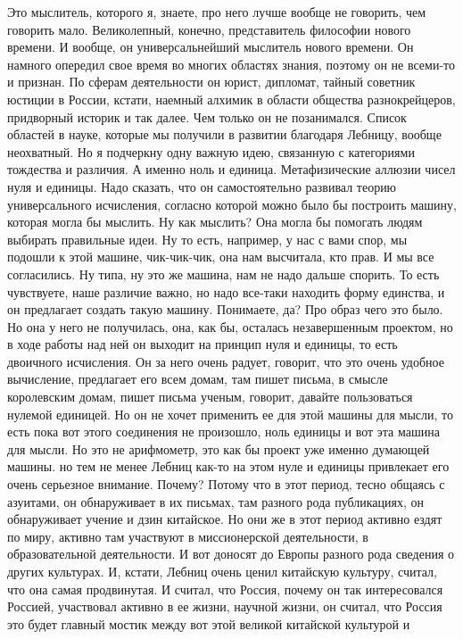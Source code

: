 Это мыслитель, которого я, знаете, про него лучше вообще не говорить,
чем говорить мало. Великолепный, конечно, представитель философии нового
времени. И вообще, он универсальнейший мыслитель нового времени. Он намного
опередил свое время во многих областях знания, поэтому он не всеми-то и признан.
По сферам деятельности он юрист, дипломат, тайный советник юстиции в России,
кстати, наемный алхимик в области общества разнокрейцеров, придворный историк и
так далее. Чем только он не позанимался. Список областей в науке, которые мы
получили в развитии благодаря Лебницу, вообще неохватный. Но я подчеркну одну
важную идею, связанную с категориями тождества и различия. А именно ноль и
единица. Метафизические аллюзии чисел нуля и единицы. Надо сказать, что он
самостоятельно развивал теорию универсального исчисления, согласно которой можно
было бы построить машину, которая могла бы мыслить. Ну как мыслить? Она могла бы
помогать людям выбирать правильные идеи. Ну то есть, например, у нас с вами
спор, мы подошли к этой машине, чик-чик-чик, она нам высчитала, кто прав. И мы
все согласились. Ну типа, ну это же машина, нам не надо дальше спорить. То есть
чувствуете, наше различие важно, но надо все-таки находить форму единства, и он
предлагает создать такую машину. Понимаете, да? Про образ чего это было. Но она
у него не получилась, она, как бы, осталась незавершенным проектом, но в ходе
работы над ней он выходит на принцип нуля и единицы, то есть двоичного
исчисления. Он за него очень радует, говорит, что это очень удобное вычисление,
предлагает его всем домам, там пишет письма, в смысле королевским домам, пишет
письма ученым, говорит, давайте пользоваться нулемой единицей. Но он не хочет
применить ее для этой машины для мысли, то есть пока вот этого соединения не
произошло, ноль единицы и вот эта машина для мысли. Но это не арифмометр, это
как бы проект уже именно думающей машины. но тем не менее Лебниц как-то на этом
нуле и единицы привлекает его очень серьезное внимание. Почему? Потому что в
этот период, тесно общаясь с азуитами, он обнаруживает в их письмах, там разного
рода публикациях, он обнаруживает учение и дзин китайское. Но они же в этот
период активно ездят по миру, активно там участвуют в миссионерской
деятельности, в образовательной деятельности. И вот доносят до Европы разного
рода сведения о других культурах. И, кстати, Лебниц очень ценил китайскую
культуру, считал, что она самая продвинутая. И считал, что Россия, почему он так
интересовался Россией, участвовал активно в ее жизни, научной жизни, он считал,
что Россия это будет главный мостик между вот этой великой китайской культурой и
